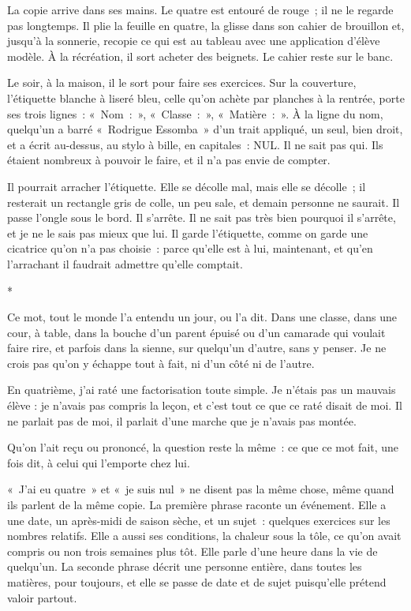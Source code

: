 \documentclass[10.5pt,twoside,openright]{book}
\newcommand{\asterisme}{\par\vspace{0.7em}\centerline{\color{gris}*\quad*\quad*}\vspace{0.7em}\par\noindent}
\begin{document}
La copie arrive dans ses mains. Le quatre est entouré de rouge ; il ne le regarde pas longtemps. Il plie la feuille en quatre, la glisse dans son cahier de brouillon et, jusqu’à la sonnerie, recopie ce qui est au tableau avec une application d’élève modèle. À la récréation, il sort acheter des beignets. Le cahier reste sur le banc.

Le soir, à la maison, il le sort pour faire ses exercices. Sur la couverture, l’étiquette blanche à liseré bleu, celle qu’on achète par planches à la rentrée, porte ses trois lignes : « Nom : », « Classe : », « Matière : ». À la ligne du nom, quelqu’un a barré « Rodrigue Essomba » d’un trait appliqué, un seul, bien droit, et a écrit au-dessus, au stylo à bille, en capitales : NUL. Il ne sait pas qui. Ils étaient nombreux à pouvoir le faire, et il n’a pas envie de compter.

Il pourrait arracher l’étiquette. Elle se décolle mal, mais elle se décolle ; il resterait un rectangle gris de colle, un peu sale, et demain personne ne saurait. Il passe l’ongle sous le bord. Il s’arrête. Il ne sait pas très bien pourquoi il s’arrête, et je ne le sais pas mieux que lui. Il garde l’étiquette, comme on garde une cicatrice qu’on n’a pas choisie : parce qu’elle est à lui, maintenant, et qu’en l’arrachant il faudrait admettre qu’elle comptait.

\asterisme

Ce mot, tout le monde l’a entendu un jour, ou l’a dit. Dans une classe, dans une cour, à table, dans la bouche d’un parent épuisé ou d’un camarade qui voulait faire rire, et parfois dans la sienne, sur quelqu’un d’autre, sans y penser. Je ne crois pas qu’on y échappe tout à fait, ni d’un côté ni de l’autre.

En quatrième, j’ai raté une factorisation toute simple. Je n’étais pas un mauvais élève : je n’avais pas compris la leçon, et c’est tout ce que ce raté disait de moi. Il ne parlait pas de moi, il parlait d’une marche que je n’avais pas montée.

Qu’on l’ait reçu ou prononcé, la question reste la même : ce que ce mot fait, une fois dit, à celui qui l’emporte chez lui.

« J’ai eu quatre » et « je suis nul » ne disent pas la même chose, même quand ils parlent de la même copie. La première phrase raconte un événement. Elle a une date, un après-midi de saison sèche, et un sujet : quelques exercices sur les nombres relatifs. Elle a aussi ses conditions, la chaleur sous la tôle, ce qu’on avait compris ou non trois semaines plus tôt. Elle parle d’une heure dans la vie de quelqu’un. La seconde phrase décrit une personne entière, dans toutes les matières, pour toujours, et elle se passe de date et de sujet puisqu’elle prétend valoir partout.
\end{document}
